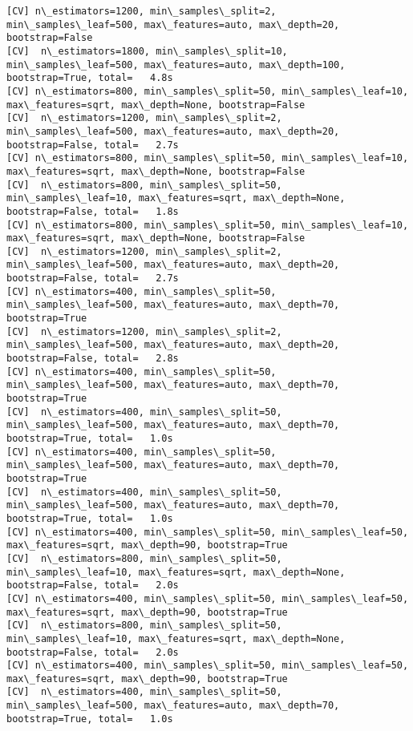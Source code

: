 \documentclass[11pt]{article}
\begin{document}
\begin{Verbatim}[commandchars=\\\{\}]
[CV] n\_estimators=1200, min\_samples\_split=2, min\_samples\_leaf=500, max\_features=auto, max\_depth=20, bootstrap=False 
[CV]  n\_estimators=1800, min\_samples\_split=10, min\_samples\_leaf=500, max\_features=auto, max\_depth=100, bootstrap=True, total=   4.8s
[CV] n\_estimators=800, min\_samples\_split=50, min\_samples\_leaf=10, max\_features=sqrt, max\_depth=None, bootstrap=False 
[CV]  n\_estimators=1200, min\_samples\_split=2, min\_samples\_leaf=500, max\_features=auto, max\_depth=20, bootstrap=False, total=   2.7s
[CV] n\_estimators=800, min\_samples\_split=50, min\_samples\_leaf=10, max\_features=sqrt, max\_depth=None, bootstrap=False 
[CV]  n\_estimators=800, min\_samples\_split=50, min\_samples\_leaf=10, max\_features=sqrt, max\_depth=None, bootstrap=False, total=   1.8s
[CV] n\_estimators=800, min\_samples\_split=50, min\_samples\_leaf=10, max\_features=sqrt, max\_depth=None, bootstrap=False 
[CV]  n\_estimators=1200, min\_samples\_split=2, min\_samples\_leaf=500, max\_features=auto, max\_depth=20, bootstrap=False, total=   2.7s
[CV] n\_estimators=400, min\_samples\_split=50, min\_samples\_leaf=500, max\_features=auto, max\_depth=70, bootstrap=True 
[CV]  n\_estimators=1200, min\_samples\_split=2, min\_samples\_leaf=500, max\_features=auto, max\_depth=20, bootstrap=False, total=   2.8s
[CV] n\_estimators=400, min\_samples\_split=50, min\_samples\_leaf=500, max\_features=auto, max\_depth=70, bootstrap=True 
[CV]  n\_estimators=400, min\_samples\_split=50, min\_samples\_leaf=500, max\_features=auto, max\_depth=70, bootstrap=True, total=   1.0s
[CV] n\_estimators=400, min\_samples\_split=50, min\_samples\_leaf=500, max\_features=auto, max\_depth=70, bootstrap=True 
[CV]  n\_estimators=400, min\_samples\_split=50, min\_samples\_leaf=500, max\_features=auto, max\_depth=70, bootstrap=True, total=   1.0s
[CV] n\_estimators=400, min\_samples\_split=50, min\_samples\_leaf=50, max\_features=sqrt, max\_depth=90, bootstrap=True 
[CV]  n\_estimators=800, min\_samples\_split=50, min\_samples\_leaf=10, max\_features=sqrt, max\_depth=None, bootstrap=False, total=   2.0s
[CV] n\_estimators=400, min\_samples\_split=50, min\_samples\_leaf=50, max\_features=sqrt, max\_depth=90, bootstrap=True 
[CV]  n\_estimators=800, min\_samples\_split=50, min\_samples\_leaf=10, max\_features=sqrt, max\_depth=None, bootstrap=False, total=   2.0s
[CV] n\_estimators=400, min\_samples\_split=50, min\_samples\_leaf=50, max\_features=sqrt, max\_depth=90, bootstrap=True 
[CV]  n\_estimators=400, min\_samples\_split=50, min\_samples\_leaf=500, max\_features=auto, max\_depth=70, bootstrap=True, total=   1.0s

\end{Verbatim}
\end{document}
